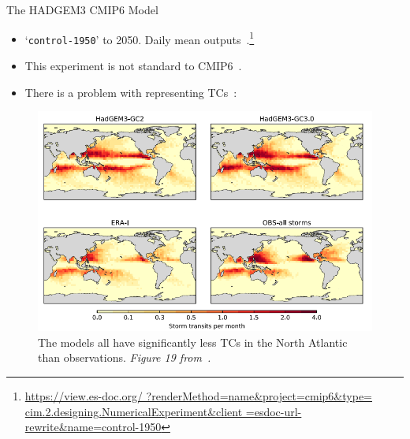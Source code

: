 \begin{frame}{The HADGEM3 CMIP6 Model~\cite{williams2018met, FurtherInfo}}
\vspace{-25pt}
\begin{itemize}
\item `\texttt{control-1950}' to 2050. Daily mean outputs~\cite{williams2018met, FurtherInfo}.\footnote{\url{https://view.es-doc.org/
                                                ?renderMethod=name&project=cmip6&type=
                                                cim.2.designing.NumericalExperiment&client
                                                =esdoc-url-rewrite&name=control-1950}}

\item This experiment is not standard to CMIP6~\cite{eyring2016overview}.
\item There is a problem with representing TCs~\cite{tomassini2017interaction}:
\end{itemize}
\begin{figure}
\vspace{-18pt}
        \includegraphics[width=0.7\linewidth]{images/HAD-TC.png}
\vspace{-10pt}
            \caption{The models all have
            significantly less TCs in the North Atlantic
             than observations.
             \textit{Figure 19 from~\cite{williams2018met}.} }
\end{figure}
\vspace{-15pt}
\end{frame}


